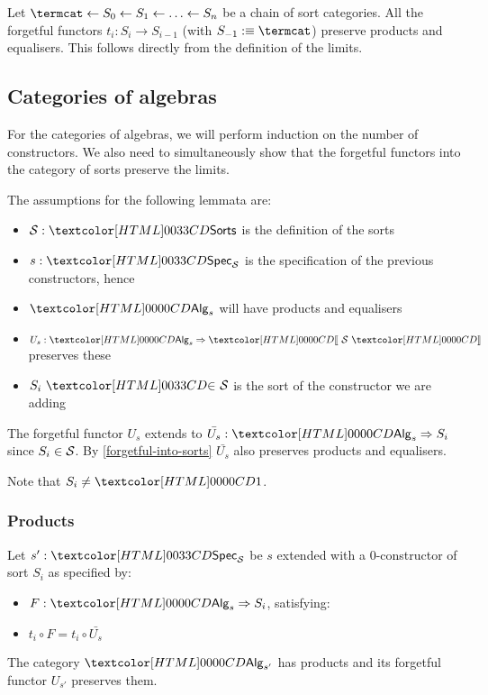 \begin{remark}
  \label{forgetful-into-sorts}
  Let $\termcat \from S_0 \from S_1 \from \hdots \from S_n$ be a chain
  of sort categories. All the forgetful functors
  $t_i : S_i \to S_{i-1}$ (with $S_{-1} \ddefeq \termcat$) preserve
  products and equalisers. This follows directly from the definition
  of the limits.
\end{remark}

\subsection{Categories of algebras}
For the categories of algebras, we will perform induction on the
number of constructors. We also need to simultaneously show that the
forgetful functors into the category of sorts preserve the limits.

The assumptions for the following lemmata are:
\begin{itemize}
\item $\Ss : \sortsty$ is the definition of the sorts
\item $s : \specty_\Ss$ is the specification of the previous constructors, hence
\item $\Alg_s$ will have products and equalisers
\item $U_s : \Func{\Alg_s}{\SortCat{\Ss}}$ preserves these
\item $\sortsin{S_i}{\Ss}$ is the sort of the constructor we are adding
\end{itemize}

The forgetful functor $U_s$ extends to
$\bar{U_s} : \Func{\Alg_s}{S_i}$ since $S_i \in \mathcal{S}$. By
\cref{forgetful-into-sorts} $\bar{U_s}$ also preserves products and
equalisers.

Note that $S_i \neq \unitty$.

\subsubsection{Products}

\begin{lemma}
  Let $s' : \specty_\Ss$ be $s$ extended with a 0-constructor of sort
  $S_i$ as specified by:
  \begin{itemize}
  \item $F : \Func{\Alg_s}{S_i}$, satisfying:
  \item $t_i \circ F = t_i \circ \bar{U_s}$
  \end{itemize}

  The category $\Alg_{s'}$ has products and its forgetful functor
  $U_{s'}$ preserves them.
\end{lemma}

